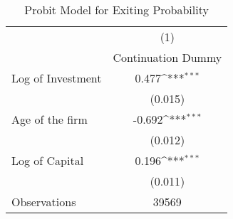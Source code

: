 \begin{table}[htbp]\centering
\def\sym#1{\ifmmode^{#1}\else\(^{#1}\)\fi}
\caption{Probit Model for Exiting Probability}
\begin{tabular}{l*{1}{c}}
\toprule
                    &\multicolumn{1}{c}{(1)}\\
                    &\multicolumn{1}{c}{Continuation Dummy}\\
\midrule
Log of Investment   &       0.477\sym{***}\\
                    &     (0.015)         \\
\addlinespace
Age of the firm     &      -0.692\sym{***}\\
                    &     (0.012)         \\
\addlinespace
Log of Capital      &       0.196\sym{***}\\
                    &     (0.011)         \\
\midrule
Observations        &       39569         \\
\bottomrule
\end{tabular}
\end{table}
